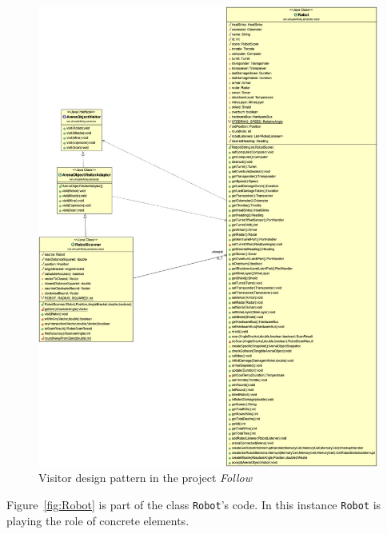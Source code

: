 \begin{figure}[htb]
    \centering
    \includegraphics[width=\columnwidth]{images/Visitor.jpeg}
    \caption{Visitor design pattern in the project \textit{Follow}}
    \label{fig:Visitor}
\end{figure}
\FloatBarrier


Figure~\ref{fig:Robot} is part of the class \texttt{Robot}'s code. In this instance \texttt{Robot} is playing the role of concrete elements. \\

